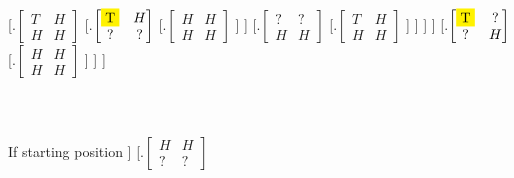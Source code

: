 \documentclass{article}
\begin{document}
        [.{$\begin{bmatrix} T & H \\ H & H \end{bmatrix}$} 
            [.{$\begin{bmatrix}\colorbox{yellow}{T} & H \\ ? & ? \end{bmatrix}$}
                [.{$\begin{bmatrix}H & H \\ H & H \end{bmatrix}$}
                ]
            ]
            [.{$\begin{bmatrix}? & ? \\ H & H \end{bmatrix}$}
                [.{$\begin{bmatrix}T & H \\ H & H \end{bmatrix}$}
                ]
            ]
        ]
    ]  
     [.{$\begin{bmatrix}\colorbox{yellow}{T} & ? \\ ? & H \end{bmatrix}$} 
         [.{$\begin{bmatrix}H & H \\ H & H \end{bmatrix}$} 
        ]
    ] 
]
\\\\
\\\\
If starting position
\Tree
[.{$\begin{bmatrix} H & T \\ T & T \end{bmatrix}$} 
    [.{$\begin{bmatrix}? & \colorbox{yellow}{T} \\ \colorbox{yellow}{T} & ? \end{bmatrix}$} 
        [.{$\begin{bmatrix}H & H \\ H & T \end{bmatrix}$} 
            [.{$\begin{bmatrix}? & ? \\ H & \colorbox{yellow}{T} \end{bmatrix}$}
                [.{$\begin{bmatrix}H & H \\ H & H \end{bmatrix}$}
                ]
            ]
            [.{$\begin{bmatrix}H & H \\ ? & ? \end{bmatrix}$}
\end{document}
